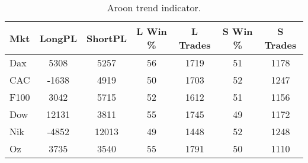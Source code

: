\begin{table}[ht]
\centering
\caption[Aroon trend indicator]{Aroon trend indicator.} 
\label{tab:aroon_results}
\begin{tabular}{lcccccc}
  \toprule Mkt & LongPL & ShortPL & L Win \% & L Trades & S Win \% & S Trades \\ 
  \midrule Dax & 5308 & 5257 & 56 & 1719 & 51 & 1178 \\ 
  CAC & -1638 & 4919 & 50 & 1703 & 52 & 1247 \\ 
  F100 & 3042 & 5715 & 52 & 1612 & 51 & 1156 \\ 
  Dow & 12131 & 3811 & 55 & 1745 & 49 & 1172 \\ 
  Nik & -4852 & 12013 & 49 & 1448 & 52 & 1248 \\ 
  Oz & 3735 & 3540 & 55 & 1791 & 50 & 1110 \\ 
   \bottomrule \end{tabular}
\end{table}
